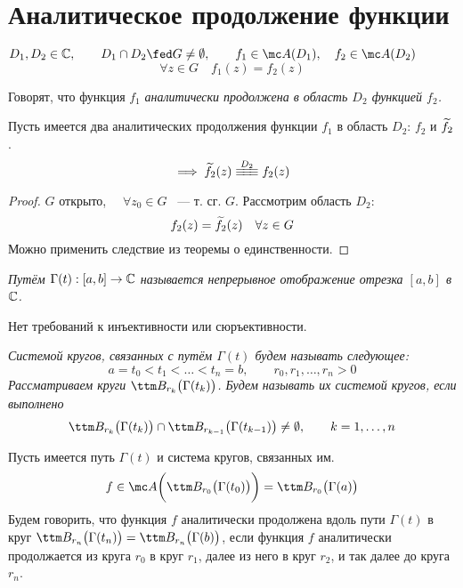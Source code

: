 \section{Аналитическое продолжение функции}

\begin{definition}
	$ D_1, D_2 \in \Co, \qquad D_1 \cap D_2 \fed G \ne \O, \qquad f_1 \in \mc A(D_1), \quad f_2 \in \mc A(D_2) $
	$$ \forall z \in G \quad f_1(z) = f_2(z) $$

	Говорят, что функция $ f_1 $ \it{аналитически продолжена} в область $ D_2 $ функцией $ f_2 $.
\end{definition}

\begin{theorem}
	Пусть имеется два аналитических продолжения функции $ f_1 $ в область $ D_2 $: $ f_2 $ и $ \widetilde{f_2} $.
	$$ \implies \vawe{f_2}(z) \equiv[D_2] f_2(z) $$
\end{theorem}

\begin{proof}
	$ G $ открыто, $ \quad \forall z_0 \in G $ ~--- т. сг. $ G $. Рассмотрим область $ D_2 $:
	$$ f_2(z) = \widetilde{f_2}(z) \quad \forall z \in G $$
	Можно применить следствие из теоремы о единственности.
\end{proof}

\begin{definition}
	\it{Путём} $ \Gamma(t) : [a, b] \to \mathbb{C} $ называется непрерывное отображение отрезка $ [a, b] $ в $ \mathbb{C} $.
\end{definition}

\begin{remark}
	Нет требований к инъективности или сюръективности.
\end{remark}

\begin{definition}
	\it{Системой кругов, связанных с путём} $ \Gamma(t) $ будем называть следующее:
	$$ a = t_0 < t_1 < \dots < t_n = b, \qquad r_0, r_1, \dots, r_n > 0 $$
	Рассматриваем круги $ \ttm B_{r_k} \big( \Gamma(t_k) \big) $.
	Будем называть их системой кругов, если выполнено
	$$ \ttm B_{r_k} \big( \Gamma(t_k) \big) \cap \ttm B_{r_{k - 1}} \big( \Gamma(t_{k - 1}) \big) \ne \O, \qquad k = 1, \dots, n $$
\end{definition}

\begin{definition}
	Пусть имеется путь $ \Gamma(t) $ и система кругов, связанных им.
	$$ f \in \mc A \bigg( \ttm B_{r_0} \big( \Gamma(t_0) \big) \bigg) = \ttm B_{r_0} \big( \Gamma(a) \big) $$
	Будем говорить, что функция $ f $ аналитически продолжена вдоль пути $ \Gamma(t) $ в круг $ \ttm B_{r_n} \big( \Gamma(t_n) \big) = \ttm B_{r_n} \big( \Gamma(b) \big) $, если функция $ f $ аналитически продолжается из круга $ r_0 $ в круг $ r_1 $, далее из него в круг $ r_2 $, и так далее до круга $ r_n $.
\end{definition}

